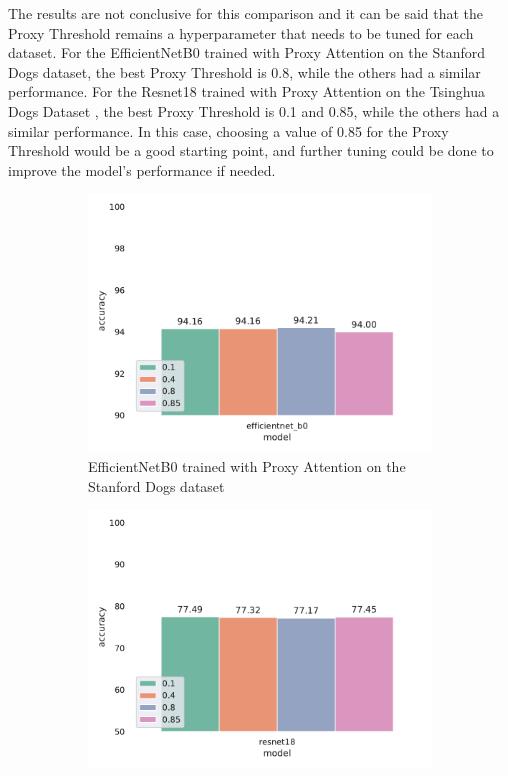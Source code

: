 \documentclass[a4paper,11pt,openright]{book}
\begin{document}
The results are not conclusive for this comparison and it can be said that the Proxy Threshold remains a hyperparameter that needs to be tuned for each dataset.
For the EfficientNetB0 \cite{tanEfficientnetRethinkingModel2019} trained with Proxy Attention on the Stanford Dogs dataset\cite{khoslaNovelDatasetFineGrained}, the best Proxy Threshold is 0.8, while the others had a similar performance. For the Resnet18 \cite{heDeepResidualLearning2016} trained with Proxy Attention on the Tsinghua Dogs Dataset \cite{zouNewDatasetDog2020}, the best Proxy Threshold is 0.1 and 0.85, while the others had a similar performance.
In this case, choosing a value of 0.85 for the Proxy Threshold would be a good starting point, and further tuning could be done to improve the model's performance if needed.

\begin{figure}[!htb]
    \begin{subfigure}[h]{.5\textwidth}
        \includegraphics[width=\linewidth, right]{results/proxy_threshold_results.pdf}
        \caption{EfficientNetB0 \cite{tanEfficientnetRethinkingModel2019} trained with Proxy Attention on the Stanford Dogs dataset\cite{khoslaNovelDatasetFineGrained}}
    \end{subfigure}
    \begin{subfigure}[h]{.5\textwidth}
        \includegraphics[width=\linewidth, left]{results/proxy_threshold_results_tsing.pdf}

\end{subfigure}
\end{figure}
\end{document}
